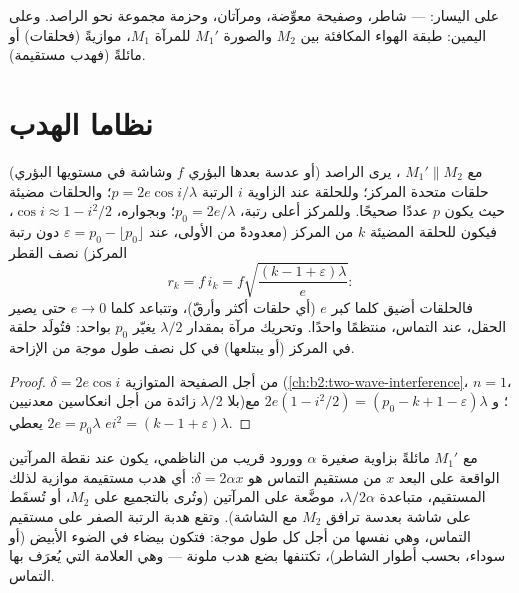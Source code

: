 \begin{omfigure}
{\small على اليسار:  --- شاطر، وصفيحة
معوِّضة، ومرآتان، وحزمة مجموعة نحو الراصد. وعلى اليمين:
طبقة الهواء المكافئة بين $M_2$ والصورة $M_1'$ للمرآة $M_1$، موازيةً
(فحلقات) أو مائلةً (فهدب مستقيمة).}
\end{omfigure}

\section{نظاما الهدب}

\begin{proposition}\label{prop:b2:michelson:rings}
مع $M_1' \parallel M_2$ ، يرى الراصد (أو عدسة
بعدها البؤري $f$ وشاشة في مستويها البؤري) حلقات
متحدة المركز؛ وللحلقة عند الزاوية $i$ الرتبة $p = 2e\cos i/\lambda$؛ والحلقات
مضيئة حيث يكون $p$ عددًا صحيحًا. وللمركز أعلى رتبة، $p_0 =
2e/\lambda$؛ وبجواره، $\cos i \approx 1 - i^2/2$، فيكون للحلقة المضيئة $k$ من
المركز (معدودةً من الأولى، عند $\varepsilon = p_0 - \lfloor p_0\rfloor$
دون رتبة المركز) نصف القطر
\[
r_k = f\,i_k = f\sqrt{\frac{(k - 1 + \varepsilon)\lambda}e} :
\]
فالحلقات أضيق كلما كبر $e$ (أي حلقات أكثر وأرقّ)، وتتباعد كلما $e \to 0$
حتى يصير الحقل، عند التماس، منتظمًا واحدًا. وتحريك مرآة بمقدار $\lambda/2$ يغيّر
$p_0$ بواحد: فتُولَد حلقة في المركز (أو يبتلعها) في كل
نصف طول موجة من الإزاحة.
\end{proposition}

\begin{proof}
$\delta = 2e\cos i$ من أجل الصفيحة المتوازية (\cref{ch:b2:two-wave-interference}،
$n = 1$، بلا $\lambda/2$ زائدة من أجل انعكاسين معدنيين)؛ و $2e(1 - i^2/2) =
(p_0 - k + 1 - \varepsilon)\lambda$ مع $2e = p_0\lambda$ يعطي $ei^2 = (k - 1 + \varepsilon)\lambda$.
\end{proof}

\begin{proposition}\label{prop:b2:michelson:wedge}
مع $M_1'$ مائلةً بزاوية صغيرة $\alpha$ وورود قريب من الناظمي، يكون
 عند نقطة المرآتين الواقعة على البعد $x$ من
مستقيم التماس هو $\delta = 2\alpha x$: أي هدب مستقيمة موازية لذلك المستقيم،
متباعدة $\lambda/2\alpha$، موضَّعة على المرآتين (وتُرى بالتجميع
على $M_2$، أو تُسقَط على شاشة بعدسة ترافق $M_2$ مع
الشاشة). وتقع هدبة الرتبة الصفر على مستقيم التماس، وهي نفسها من أجل
كل طول موجة: فتكون بيضاء في الضوء الأبيض (أو سوداء، بحسب
أطوار الشاطر)، تكتنفها بضع هدب ملونة --- وهي
العلامة التي يُعرَف بها التماس.
\end{proposition}

